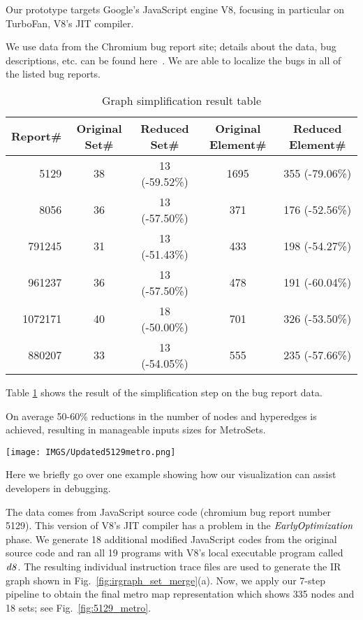 \documentclass[runningheads]{llncs}
\begin{document}
Our prototype targets Google's JavaScript engine V8, focusing in particular on TurboFan, V8's JIT compiler.

We use data from the Chromium bug report site; details about the data, bug descriptions, etc. can be found here~\cite{DBLP:conf/vee/LimD21}.
We are able to localize the bugs in all of the listed bug reports.

\begin{table}[h]
\caption{Graph simplification result table}\label{tbl:simplification-result}
\begin{center}
\begin{tabular}{|r|c|c|c|c|}\hline
  {\bf Report\#} 
      & {\bf Original Set\#} 
      & {\bf Reduced Set\#}
      & {\bf Original Element\#}
      & {\bf Reduced Element\#}\\ \hline\hline
    5129 & 38 & 13 (-59.52\%) & 1695 & 355 (-79.06\%)\\ \hline
    8056 & 36 & 13 (-57.50\%) & 371 & 176 (-52.56\%)\\ \hline
    791245 & 31 & 13 (-51.43\%) & 433 & 198 (-54.27\%)\\ \hline
    961237 & 36 & 13 (-57.50\%) & 478 & 191 (-60.04\%)\\ \hline
    1072171 & 40 & 18 (-50.00\%) & 701 & 326 (-53.50\%)\\ \hline
    880207 & 33 & 13 (-54.05\%) & 555 & 235 (-57.66\%)\\ \hline
\end{tabular}
\end{center}
\end{table}

Table \ref{tbl:simplification-result} shows the result of the simplification step on the bug report data. 

On average 50-60\% reductions in the number of nodes and hyperedges is achieved, resulting in manageable inputs sizes for MetroSets.

\begin{figure*}[ht]
    \centering
    \texttt{[image: IMGS/Updated5129metro.png]}
    \caption{Metro map of IR graph from bug report 5129}
    \label{fig:5129_metro}
\end{figure*}

\bigskip{} Here we briefly go over one example showing how our visualization can assist developers in debugging.

The data comes from JavaScript source code (chromium bug report number 5129). This version of V8's JIT compiler has a problem in the $\it EarlyOptimization$ phase.
We generate 18 additional modified JavaScript codes from the original source code and ran all 19 programs with V8's local executable program called $\it d8$. The resulting  individual instruction trace files are used to generate the IR graph shown in Fig.~\ref{fig:irgraph_set_merge}(a).
Now, we apply our 7-step pipeline to obtain the final metro map representation which shows 335 nodes and 18 sets; see Fig.~\ref{fig:5129_metro}.
\end{document}
